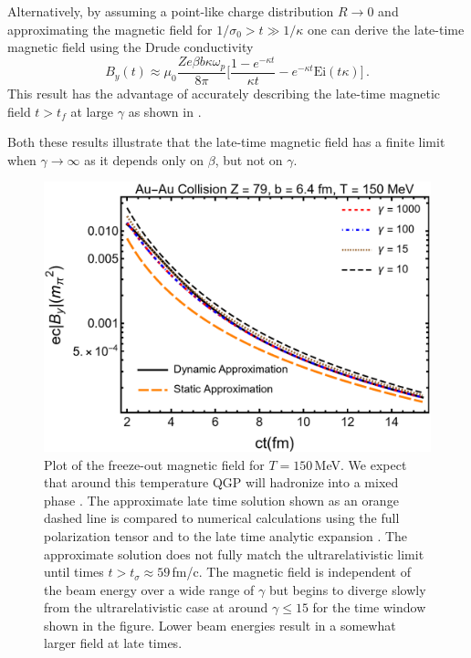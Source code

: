 Alternatively, by assuming a point-like charge distribution $R\rightarrow0$ and approximating the magnetic field for $ 1/\sigma_0 > t\gg 1/\kappa$ one can derive the late-time magnetic field using the Drude conductivity 
\begin{equation}\label{eq:latetimeB}
   B_y(t) \approx  \mu_0 \frac{ Ze \beta b \kappa \omega_p }{8\pi}\bigg[ \frac{1- e^{-\kappa t}}{\kappa t} - e^{-\kappa t} \text{Ei}\left(t\kappa\right)\bigg]\,.
\end{equation}
This result has the advantage of accurately describing the late-time magnetic field $t>t_f$  at large $\gamma$ as shown in .

Both these results illustrate that the late-time magnetic field has a finite limit when $\gamma\rightarrow\infty$ as it depends only on $\beta$, but not on $\gamma$.
\begin{figure}
\centering
\includegraphics[width=0.85\linewidth]{plots/chap02QCD/bfgaamacomp.png}
    \caption{Plot of the freeze-out magnetic field for $T= 150$\,MeV. We expect that around this temperature QGP will hadronize into a mixed phase \cite{Letessier:1992xd}. The approximate late time solution  shown as an orange dashed line is compared to numerical calculations using the full polarization tensor  and to the late time analytic expansion . The approximate solution does not fully match the ultrarelativistic limit until times $t > t_{\sigma} \approx 59$\,fm/c. The magnetic field is independent of the beam energy over a wide range of $\gamma$ but begins to diverge slowly from the ultrarelativistic case at around $\gamma \leq 15$ for the time window shown in the figure. Lower beam energies result in a somewhat larger field at late times. \label{fig:bcolcomp}}
\end{figure}
